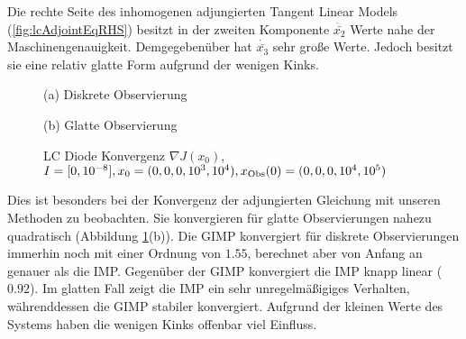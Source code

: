 Die rechte Seite des inhomogenen adjungierten Tangent Linear Models (\ref{fig:lcAdjointEqRHS}) besitzt in der zweiten Komponente  $\dot{\bar{x_2}}$ Werte nahe der Maschinengenauigkeit. Demgegebenüber hat $\dot{\bar{x_3}}$ sehr große Werte. Jedoch besitzt sie eine relativ glatte Form aufgrund der wenigen Kinks. 
\begin{figure}[H]
\footnotesize 
\centering
\begin{minipage}[b]{0.49\linewidth}

\caption*{(a) Diskrete Observierung}
\end{minipage}
\begin{minipage}[b]{0.49\linewidth}

\caption*{(b) Glatte Observierung}
\end{minipage}
% 
% 
\caption{LC Diode Konvergenz $\nabla J(x_0)$, \\$I=[0,10^{-8}],x_0=(0,0,0,10^3,10^{4}),x_{\text{Obs}}(0)=(0,0,0,10^4,10^5) $}
\label{fig:lcAdjointConvergence}
\end{figure}
Dies ist besonders bei der Konvergenz der adjungierten Gleichung mit unseren Methoden zu beobachten.
Sie konvergieren für glatte Observierungen nahezu quadratisch (Abbildung \ref{fig:lcAdjointConvergence}(b)). Die GIMP konvergiert für diskrete Observierungen immerhin noch mit einer Ordnung von $1.55$, berechnet aber von Anfang an genauer als die IMP. Gegenüber der GIMP konvergiert die IMP knapp linear ($0.92$). Im glatten Fall zeigt die IMP ein sehr unregelmäßigiges Verhalten, währenddessen die GIMP stabiler konvergiert. Aufgrund der kleinen Werte des Systems haben die wenigen Kinks offenbar viel Einfluss. 

